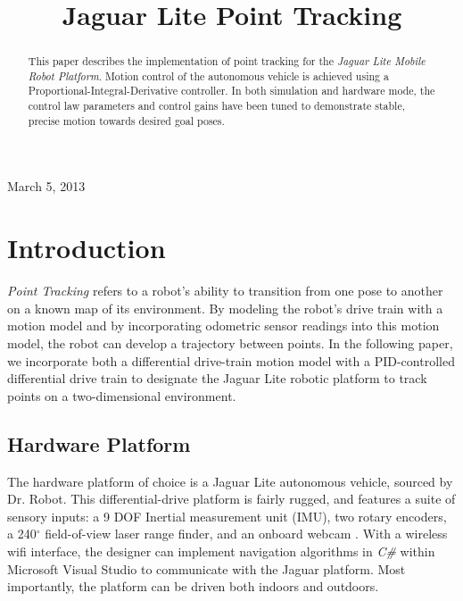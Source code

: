 \documentclass[conference]{IEEEtran}
\begin{document}
%
\title{Jaguar Lite Point Tracking}

\author{
\and
{}
}

\maketitle
{\flushleft March 5, 2013}\\
\IEEEpeerreviewmaketitle

\begin{abstract}
This paper describes the implementation of point tracking for the \emph{Jaguar Lite Mobile Robot Platform}. Motion control of the autonomous vehicle is achieved using a Proportional-Integral-Derivative controller. In both simulation and hardware mode, the control law parameters and control gains have been tuned to demonstrate stable, precise motion towards desired goal poses.
\end{abstract} 

\section{Introduction}
\emph{Point Tracking} refers to a robot's ability to transition 
from one pose to another on a known map of its environment. By modeling the 
robot's drive train with a motion model and by incorporating odometric 
sensor readings into this motion model, the robot can develop a trajectory 
between points.  In the following paper, we incorporate both a differential drive-train 
motion model with a PID-controlled differential drive train to designate the
Jaguar Lite robotic platform to track points on a two-dimensional environment.

\subsection{Hardware Platform}
The hardware platform of choice is a Jaguar Lite autonomous vehicle, sourced 
by Dr. Robot.  This differential-drive platform is fairly rugged, and 
features a suite of sensory inputs: a 9 DOF Inertial measurement unit (IMU), 
two rotary encoders, a 240$^{\circ}$ field-of-view laser range finder, and an
onboard webcam \cite{Dr.RobotWebsite}.  With a wireless wifi interface, the 
designer can implement navigation algorithms in \emph{C\#} within Microsoft Visual Studio to communicate with the Jaguar platform. Most importantly, the platform can  be driven both 
indoors and outdoors. 
\end{document}
